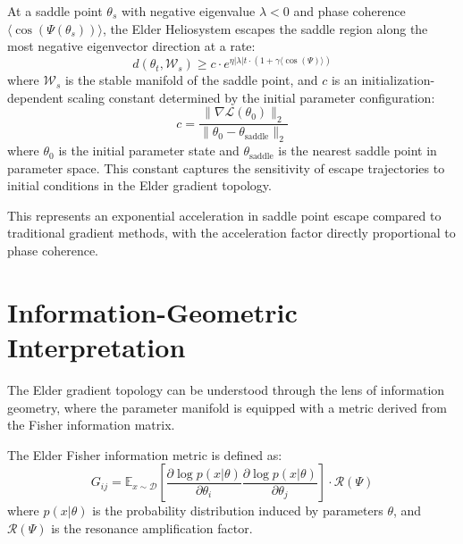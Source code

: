\begin{theorem}
At a saddle point $\theta_s$ with negative eigenvalue $\lambda < 0$ and phase coherence $\langle\cos(\Psi(\theta_s))\rangle$, the Elder Heliosystem escapes the saddle region along the most negative eigenvector direction at a rate:
\begin{equation}
d(\theta_t, \mathcal{W}_s) \geq c \cdot e^{\eta |\lambda| t \cdot (1 + \gamma \langle\cos(\Psi)\rangle)}
\end{equation}
where $\mathcal{W}_s$ is the stable manifold of the saddle point, and $c$ is an initialization-dependent scaling constant determined by the initial parameter configuration:
\begin{equation}
c = \frac{\|\nabla \mathcal{L}(\theta_0)\|_2}{\|\theta_0 - \theta_{\text{saddle}}\|_2}
\end{equation}
where $\theta_0$ is the initial parameter state and $\theta_{\text{saddle}}$ is the nearest saddle point in parameter space. This constant captures the sensitivity of escape trajectories to initial conditions in the Elder gradient topology.
\end{theorem}

This represents an exponential acceleration in saddle point escape compared to traditional gradient methods, with the acceleration factor directly proportional to phase coherence.

\section{Information-Geometric Interpretation}

The Elder gradient topology can be understood through the lens of information geometry, where the parameter manifold is equipped with a metric derived from the Fisher information matrix.

\begin{definition}
The Elder Fisher information metric is defined as:
\begin{equation}
G_{ij} = \mathbb{E}_{x \sim \mathcal{D}} \left[ \frac{\partial \log p(x|\theta)}{\partial \theta_i} \frac{\partial \log p(x|\theta)}{\partial \theta_j} \right] \cdot \mathcal{R}(\Psi)
\end{equation}
where $p(x|\theta)$ is the probability distribution induced by parameters $\theta$, and $\mathcal{R}(\Psi)$ is the resonance amplification factor.
\end{definition}

